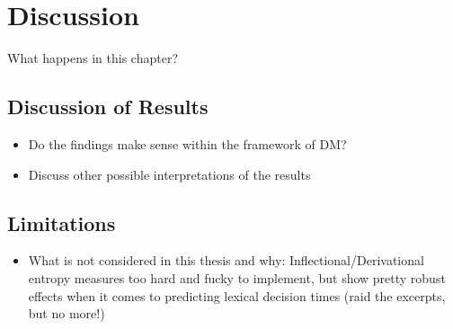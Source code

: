 \chapter{Discussion}\label{chp:discussion}

What happens in this chapter?

\section{Discussion of Results}
\begin{itemize}
\item Do the findings make sense within the framework of DM?
\item Discuss other possible interpretations of the results
\end{itemize}
\section{Limitations}
\begin{itemize}
\item What is not considered in this thesis and why: Inflectional/Derivational entropy measures too hard and fucky to implement, but show pretty robust effects when it comes to predicting lexical decision times (raid the excerpts, but no more!)
\end{itemize}
